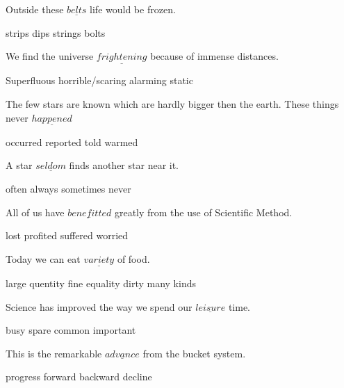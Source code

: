 \documentclass{exam}
\begin{document}
\begin{questions}
Outside these \(\underline{belts}\) life would be frozen.\\
\begin{oneparchoices}
\choice strips
\choice dips
\choice strings
\choice bolts
\end{oneparchoices}
\question 

We find the universe \(\underline{frightening}\) because of immense distances.\\
\begin{oneparchoices}
\choice Superfluous
\choice horrible/scaring
\choice alarming
\choice static
\end{oneparchoices}
\question 

The few stars are known which are hardly bigger then the earth.
These things never \(\underline{happened}\)\\
\begin{oneparchoices}
\choice occurred
\choice reported
\choice told
\choice warmed
\end{oneparchoices}
\question 

A star \(\underline{seldom}\) finds another star near it.\\
\begin{oneparchoices}
\choice often
\choice always
\choice sometimes
\choice never
\end{oneparchoices}
\question 

All of us have \(\underline{benefitted}\) greatly from the use of Scientific Method.\\
\begin{oneparchoices}
\choice lost
\choice profited
\choice suffered
\choice worried
\end{oneparchoices}
\question 

Today we can eat \(\underline{variety}\) of food.\\
\begin{oneparchoices}
\choice large quentity
\choice fine equality
\choice dirty
\choice many kinds
\end{oneparchoices}
\question 

Science has improved  the way we spend our \(\underline{leisure}\) time.\\
\begin{oneparchoices}
\choice busy
\choice spare
\choice common
\choice important
\end{oneparchoices}
\question 

This is the remarkable \(\underline{advance}\) from the bucket system.\\
\begin{oneparchoices}
\choice progress
\choice forward
\choice backward
\choice decline
\end{oneparchoices}
\question 


\end{questions}
\end{document}
